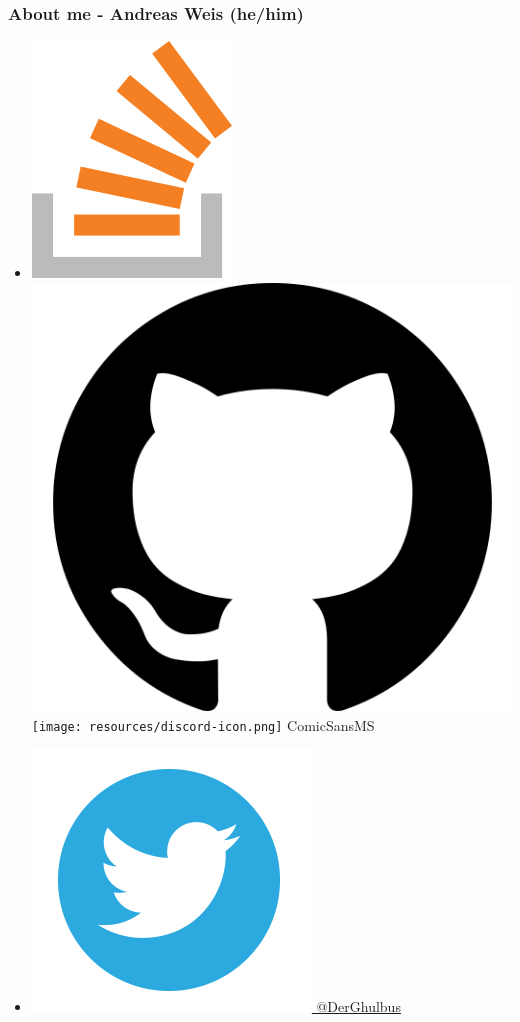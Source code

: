 \documentclass[aspectratio=169]{beamer}
\begin{document}
\begin{frame}[fragile]
  \frametitle{About me - Andreas Weis (he/him)}

  \begin{itemize}
    \setlength\itemsep{1.5em}

    \item \href{https://stackoverflow.com/users/577603/comicsansms}{\includegraphics[height=.05\textheight]{resources/so-icon.png}} \href{https://github.com/ComicSansMS}{\includegraphics[height=.05\textheight]{resources/github-icon.png}} \texttt{[image: resources/discord-icon.png]} ComicSansMS

    \item \href{https://twitter.com/DerGhulbus/}{\includegraphics[height=.05\textheight]{resources/twitter-icon.png} @DerGhulbus}


\end{itemize}
\end{frame}
\end{document}
